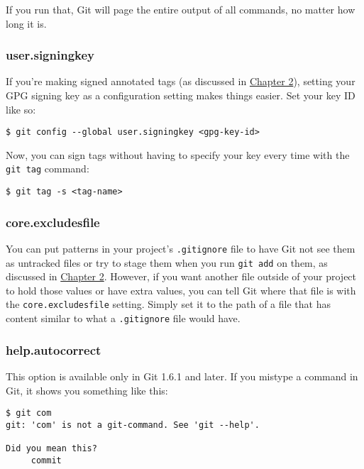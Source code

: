 \documentclass[a4paper]{book}
\newcommand{\prechap}{Chapter }
\newcommand{\postchap}{}
\newcommand{\chapref}[1]{\hyperref[chap:#1]{\prechap #1\postchap}}
\begin{document}
If you run that, Git will page the entire output of all commands, no matter how long it is.

\subsubsection{user.signingkey}

If you're making signed annotated tags (as discussed in \chapref{2}), setting your GPG signing key as a configuration setting makes things easier. Set your key ID like so:

\begin{shaded}\begin{verbatim}
$ git config --global user.signingkey <gpg-key-id>
\end{verbatim}\end{shaded}

Now, you can sign tags without having to specify your key every time with the \texttt{git tag} command:

\begin{shaded}\begin{verbatim}
$ git tag -s <tag-name>
\end{verbatim}\end{shaded}

\subsubsection{core.excludesfile}

You can put patterns in your project's \texttt{.gitignore} file to have Git not see them as untracked files or try to stage them when you run \texttt{git add} on them, as discussed in \chapref{2}. However, if you want another file outside of your project to hold those values or have extra values, you can tell Git where that file is with the \texttt{core.excludesfile} setting. Simply set it to the path of a file that has content similar to what a \texttt{.gitignore} file would have.

\subsubsection{help.autocorrect}

This option is available only in Git 1.6.1 and later. If you mistype a command in Git, it shows you something like this:

\begin{shaded}\begin{verbatim}
$ git com
git: 'com' is not a git-command. See 'git --help'.

Did you mean this?
     commit
\end{verbatim}\end{shaded}
\end{document}
